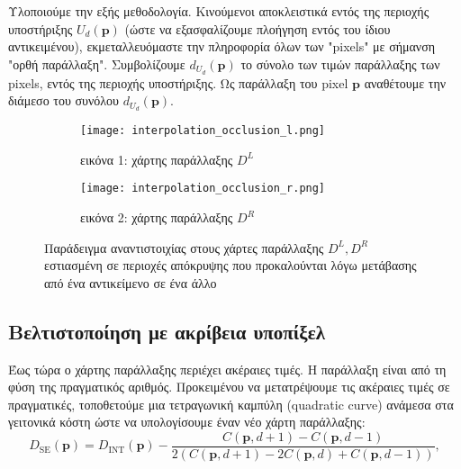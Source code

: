 Υλοποιούμε την εξής μεθοδολογία. Κινούμενοι αποκλειστικά εντός της περιοχής υποστήριξης \e $U_d(\textbf{p})$ \g (ώστε να εξασφαλίζουμε πλοήγηση εντός του ίδιου αντικειμένου), εκμεταλλευόμαστε την πληροφορία όλων των \e "pixels" \g με σήμανση "ορθή παράλλαξη". Συμβολίζουμε \e $d_{U_d}(\textbf{p})$ \g το σύνολο των τιμών παράλλαξης των \e pixels, \g εντός της περιοχής υποστήριξης. Ως παράλλαξη του \e pixel $\textbf{p}$ \g αναθέτουμε την διάμεσο του συνόλου \e $d_{U_d}(\textbf{p})$. \g

\begin{figure}
	\centering
	\begin{subfigure}{0.49\textwidth}
		\texttt{[image: interpolation\_occlusion\_l.png]}
		\caption{εικόνα 1: χάρτης παράλλαξης $D^L$}
	\end{subfigure}
	\begin{subfigure}{0.49\textwidth}
		\texttt{[image: interpolation\_occlusion\_r.png]}
		\caption{εικόνα 2: χάρτης παράλλαξης $D^R$} 
	\end{subfigure}
	\caption{Παράδειγμα αναντιστοιχίας στους χάρτες παράλλαξης $D^L, D^R$ εστιασμένη σε περιοχές απόκρυψης που προκαλούνται λόγω μετάβασης από ένα αντικείμενο σε ένα άλλο}
	\label{fig:interpol_occl}
\end{figure}

\subsection{Βελτιστοποίηση με ακρίβεια υποπίξελ}

Έως τώρα ο χάρτης παράλλαξης περιέχει ακέραιες τιμές. Η παράλλαξη είναι από τη φύση της πραγματικός αριθμός. Προκειμένου να μετατρέψουμε τις ακέραιες τιμές σε πραγματικές, τοποθετούμε μια τετραγωνική καμπύλη \e (quadratic curve) \g ανάμεσα στα γειτονικά κόστη ώστε να υπολογίσουμε έναν νέο χάρτη παράλλαξης:
\e
\begin{equation*}
D_{\text{SE}}(\mathbf{p}) = D_{\text{INT}}(\mathbf{p}) - \frac {C(\mathbf{p}, d + 1) - C(\mathbf{p}, d - 1)} {2 (C(\mathbf{p}, d + 1) - 2 C(\mathbf{p}, d    ) + C(\mathbf{p}, d - 1))},
\end{equation*}
\g


